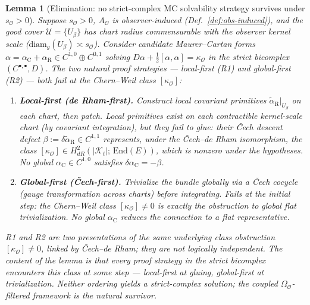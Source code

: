 \documentclass[11pt]{article}
\newtheorem{lemma}{Lemma}
\newcommand{\Obs}{\mathcal{O}}
\newcommand{\OmegaO}{\Omega_{\Obs}}
\newcommand{\kappaO}{\kappa_{\Obs}}
\newcommand{\AO}{A_{\Obs}}
\newcommand{\rmin}{s_{\Obs}}
\newcommand{\EE}{E}
\newcommand{\Kt}{\mathcal{K}_t}
\newcommand{\End}{\mathrm{End}}
\begin{document}
\begin{lemma}[Elimination: no strict-complex MC solvability strategy survives under $\rmin > 0$]
\label{lem:elimination}
Suppose $\rmin > 0$, $\AO$ is observer-induced
(Def.~\ref{def:obs-induced}), and the good cover
$\mathcal{U} = \{U_\beta\}$ has chart radius commensurable with
the observer kernel scale ($\mathrm{diam}_g(U_\beta) \asymp \rmin$).
Consider candidate Maurer--Cartan forms
$\alpha = \alpha_{\mathrm{C}} + \alpha_{\mathrm{R}}
\in C^{1,0} \oplus C^{0,1}$ solving
$D\alpha + \tfrac{1}{2}[\alpha, \alpha] = \kappaO$
in the \emph{strict} bicomplex $(C^{\bullet, \bullet}, D)$. The
two natural proof strategies --- local-first (R1) and
global-first (R2) --- both fail at the Chern--Weil class
$[\kappaO]$:
\begin{enumerate}[label=(R\arabic*),leftmargin=*,itemsep=2pt]
\item \textbf{Local-first (de Rham-first).} Construct local
covariant primitives
$\tilde\alpha_{\mathrm{R}}|_{U_\beta}$ on each chart, then patch.
Local primitives \emph{exist} on each contractible
kernel-scale chart (by covariant integration), but they fail to
glue: their \v{C}ech descent defect
$\beta := \delta \tilde\alpha_{\mathrm{R}} \in C^{1,1}$ represents,
under the \v{C}ech--de Rham isomorphism, the class
$[\kappaO] \in H^2_{dR}(|\Kt|;\, \End(\EE))$, which is nonzero
under the hypotheses. No global
$\alpha_{\mathrm{C}} \in C^{1,0}$ satisfies $\delta \alpha_{\mathrm{C}}
= -\beta$.
\item \textbf{Global-first (\v{C}ech-first).} Trivialize the
bundle globally via a \v{C}ech cocycle (gauge transformation
across charts) before integrating. Fails at the initial step:
the Chern--Weil class $[\kappaO] \neq 0$ is exactly the obstruction
to global flat trivialization. No global
$\alpha_{\mathrm{C}}$ reduces the connection to a flat
representative.
\end{enumerate}
R1 and R2 are \emph{two presentations of the same underlying
class obstruction} $[\kappaO] \neq 0$, linked by \v{C}ech--de Rham;
they are not logically independent. The content of the lemma is
that \emph{every proof strategy in the strict bicomplex encounters
this class at some step} --- local-first at gluing, global-first
at trivialization. Neither ordering yields a strict-complex
solution; the coupled $\OmegaO$-filtered framework is the natural
survivor.
\end{lemma}
\end{document}
